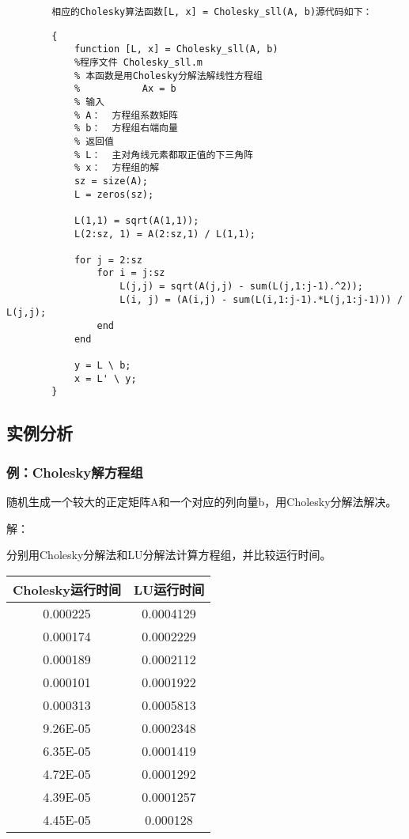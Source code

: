 \documentclass[12pt, a4paper, oneside]{ctexart}
\begin{document}
	\begin{verbatim}
		相应的Cholesky算法函数[L, x] = Cholesky_sll(A, b)源代码如下：
	\end{verbatim}
	\begin{lstlisting}
		{
			function [L, x] = Cholesky_sll(A, b)
			%程序文件 Cholesky_sll.m
			% 本函数是用Cholesky分解法解线性方程组
			%           Ax = b
			% 输入
			% A：  方程组系数矩阵
			% b：  方程组右端向量 
			% 返回值
			% L：  主对角线元素都取正值的下三角阵
			% x：  方程组的解
			sz = size(A);
			L = zeros(sz);
			
			L(1,1) = sqrt(A(1,1));
			L(2:sz, 1) = A(2:sz,1) / L(1,1);
			
			for j = 2:sz
				for i = j:sz
					L(j,j) = sqrt(A(j,j) - sum(L(j,1:j-1).^2));
					L(i, j) = (A(i,j) - sum(L(i,1:j-1).*L(j,1:j-1))) / L(j,j);
				end
			end
			
			y = L \ b;
			x = L' \ y;
		}
	\end{lstlisting}
	
		\subsection{实例分析}
	\subsubsection{例：Cholesky解方程组}
	随机生成一个较大的正定矩阵A和一个对应的列向量b，用Cholesky分解法解决。
	
	解：
	
	分别用Cholesky分解法和LU分解法计算方程组，并比较运行时间。
	
\begin{table}[h]
	\centering
	\begin{tabular}{|c|c|}
		\hline
		Cholesky运行时间 & LU运行时间    \\ \hline
		0.000225     & 0.0004129 \\
		0.000174     & 0.0002229 \\
		0.000189     & 0.0002112 \\
		0.000101     & 0.0001922 \\
		0.000313     & 0.0005813 \\
		9.26E-05     & 0.0002348 \\
		6.35E-05     & 0.0001419 \\
		4.72E-05     & 0.0001292 \\
		4.39E-05     & 0.0001257 \\
		4.45E-05     & 0.000128  \\ \hline
	\end{tabular}
\end{table}
	
\end{document}
